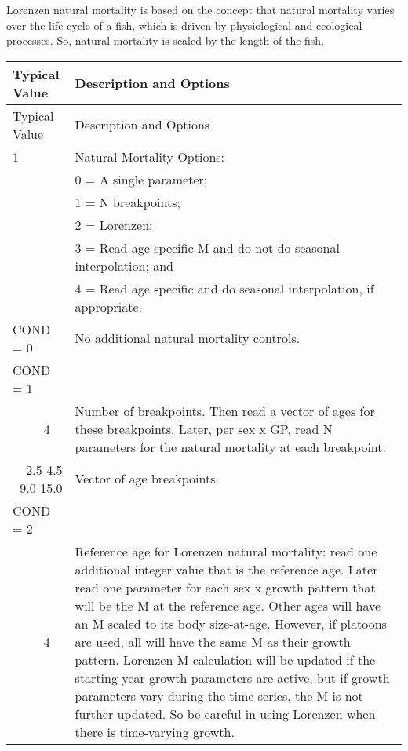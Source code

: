 Lorenzen natural mortality is based on the concept that natural mortality varies over the life cycle of a fish, which is driven by physiological and ecological processes.  So, natural mortality is scaled by the length of the fish.

\begin{longtable}{p{0.5cm} p{2cm} p{12.75cm}}
	\hline	
	\multicolumn{2}{l}{Typical Value} & Description and Options\Tstrut\Bstrut\\
	\hline
	\endfirsthead

	\hline
	\multicolumn{2}{l}{Typical Value} & Description and Options\Tstrut\Bstrut\\
	\hline
	\endhead
	\hline

	\endfoot
	
	\endlastfoot

	1 & & Natural Mortality Options:\Tstrut\\
	  & & 0 = A single parameter;\\
	  & & 1 = N breakpoints;\\
	  & & 2 = Lorenzen; \\
	  & & 3 = Read age specific M and do not do seasonal interpolation; and\\
	  & & 4 = Read age specific and do seasonal interpolation, if appropriate.\Bstrut\\
	\hline

	\multicolumn{2}{l}{COND = 0} & No additional natural mortality controls. \Tstrut\Bstrut\\
	\hline

	\multicolumn{2}{l}{COND = 1} & \Tstrut\Bstrut\\
	& 4 & Number of breakpoints.  Then read a vector of ages for these breakpoints. Later, per sex x GP, read N parameters for the natural mortality at each breakpoint.\\

	\multicolumn{2}{r}{2.5 4.5 9.0 15.0} & Vector of age breakpoints. \Bstrut\\
	\hline
	
	\multicolumn{2}{l}{COND = 2} & \Tstrut\\
	& 4 \Tstrut & Reference age for Lorenzen natural mortality: read one additional integer value that is the reference age. Later read one parameter for each sex x growth pattern that will be the M at the reference age.  Other ages will have an M scaled to its body size-at-age.  However, if platoons are used, all will have the same M as their growth pattern.  Lorenzen M calculation will be updated if the starting year growth parameters are active, but if growth parameters vary during the time-series, the M is not further updated.  So be careful in using Lorenzen when there is time-varying growth.\\
	\hline
	

\end{longtable}
